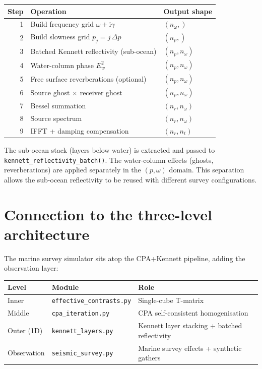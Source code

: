 \documentclass[11pt,a4paper]{article}
\newcommand{\D}{\Delta}
\newcommand{\ii}{\mathrm{i}}
\begin{document}
\begin{center}
\renewcommand{\arraystretch}{1.3}
\begin{tabular}{rll}
\toprule
\textbf{Step} & \textbf{Operation} & \textbf{Output shape} \\
\midrule
1 & Build frequency grid $\omega + \ii\gamma$ & $(n_\omega,)$ \\
2 & Build slowness grid $p_j = j\,\D p$ & $(n_p,)$ \\
3 & Batched Kennett reflectivity (sub-ocean) & $(n_p, n_\omega)$ \\
4 & Water-column phase $E_w^2$ & $(n_p, n_\omega)$ \\
5 & Free surface reverberations (optional) & $(n_p, n_\omega)$ \\
6 & Source ghost $\times$ receiver ghost & $(n_p, n_\omega)$ \\
7 & Bessel summation & $(n_r, n_\omega)$ \\
8 & Source spectrum & $(n_r, n_\omega)$ \\
9 & IFFT + damping compensation & $(n_r, n_t)$ \\
\bottomrule
\end{tabular}
\end{center}

\noindent
The sub-ocean stack (layers below water) is extracted and passed
to \texttt{kennett\_reflectivity\_batch()}.  The water-column
effects (ghosts, reverberations) are applied separately in the
$(p, \omega)$ domain.  This separation allows the sub-ocean
reflectivity to be reused with different survey configurations.

\section{Connection to the three-level architecture}
\label{sec:architecture}

The marine survey simulator sits atop the CPA+Kennett pipeline,
adding the observation layer:

\begin{center}
\renewcommand{\arraystretch}{1.3}
\begin{tabular}{lp{5cm}p{5cm}}
\toprule
\textbf{Level} & \textbf{Module} & \textbf{Role} \\
\midrule
Inner
  & \texttt{effective\_contrasts.py}
  & Single-cube T-matrix \\
Middle
  & \texttt{cpa\_iteration.py}
  & CPA self-consistent homogenisation \\
Outer (1D)
  & \texttt{kennett\_layers.py}
  & Kennett layer stacking + batched reflectivity \\
Observation
  & \texttt{seismic\_survey.py}
  & Marine survey effects + synthetic gathers \\
\bottomrule
\end{tabular}
\end{center}
\end{document}
